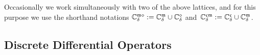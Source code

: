 \documentclass[12pt,oneside,english]{amsart}
\numberwithin{equation}{section}
\numberwithin{figure}{section}
\theoremstyle{plain}
\theoremstyle{plain}
\theoremstyle{plain}
\theoremstyle{plain}
\theoremstyle{remark}
\theoremstyle{definition}
\theoremstyle{plain}
\theoremstyle{plain}
\numberwithin{thm}{section}
\begin{document}
% 

Occasionally we work simultaneously with two of the above lattices, and 
for this purpose we use the shorthand notations
${\mathbb{C}_{{\delta}}^{\mathfrak{m}\diamond}} := {\mathbb{C}_{{\delta}}^{\mathfrak{m}}} \cup {\mathbb{C}_{{\delta}}^{\diamond}}$
and~${\mathbb{C}_{{\delta}}^{\mathfrak{c}\mathfrak{m}}} := {\mathbb{C}_{{\delta}}^{\mathfrak{c}}} \cup {\mathbb{C}_{{\delta}}^{\mathfrak{m}}}$.


\subsection{\label{subsec:discrete-differential-operators}Discrete Differential
Operators}
\end{document}
